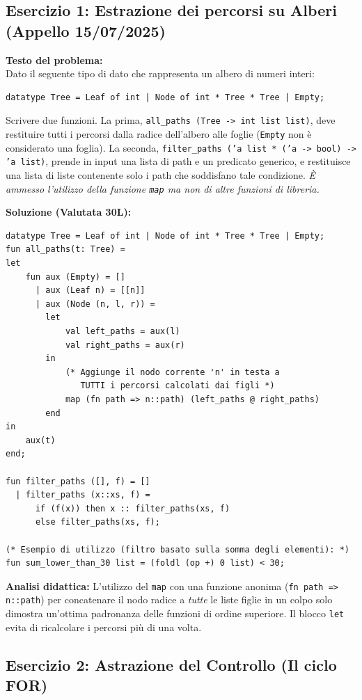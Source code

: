 \documentclass[12pt, a4paper]{article}
\begin{document}
\subsection{Esercizio 1: Estrazione dei percorsi su Alberi (Appello 15/07/2025)}

\textbf{Testo del problema:}\\
Dato il seguente tipo di dato che rappresenta un albero di numeri interi:
\begin{verbatim}
datatype Tree = Leaf of int | Node of int * Tree * Tree | Empty;
\end{verbatim}
Scrivere due funzioni. La prima, \texttt{all\_paths (Tree -> int list list)}, deve restituire tutti i percorsi dalla radice dell'albero alle foglie (\texttt{Empty} non è considerato una foglia).
La seconda, \texttt{filter\_paths ('a list * ('a -> bool) -> 'a list)}, prende in input una lista di path e un predicato generico, e restituisce una lista di liste contenente solo i path che soddisfano tale condizione. \textit{È ammesso l'utilizzo della funzione \texttt{map} ma non di altre funzioni di libreria.}

\newpage

\textbf{Soluzione (Valutata 30L):}
\begin{verbatim}
datatype Tree = Leaf of int | Node of int * Tree * Tree | Empty;
fun all_paths(t: Tree) =
let
    fun aux (Empty) = []
      | aux (Leaf n) = [[n]]
      | aux (Node (n, l, r)) =
        let
            val left_paths = aux(l)
            val right_paths = aux(r)
        in
            (* Aggiunge il nodo corrente 'n' in testa a 
               TUTTI i percorsi calcolati dai figli *)
            map (fn path => n::path) (left_paths @ right_paths)
        end
in
    aux(t)
end;

fun filter_paths ([], f) = []
  | filter_paths (x::xs, f) = 
      if (f(x)) then x :: filter_paths(xs, f) 
      else filter_paths(xs, f);

(* Esempio di utilizzo (filtro basato sulla somma degli elementi): *)
fun sum_lower_than_30 list = (foldl (op +) 0 list) < 30;
\end{verbatim}
\textbf{Analisi didattica:} L'utilizzo del \texttt{map} con una funzione anonima (\texttt{fn path => n::path}) per concatenare il nodo radice a \textit{tutte} le liste figlie in un colpo solo dimostra un'ottima padronanza delle funzioni di ordine superiore. Il blocco \texttt{let} evita di ricalcolare i percorsi più di una volta.

\subsection{Esercizio 2: Astrazione del Controllo (Il ciclo FOR)}
\end{document}
